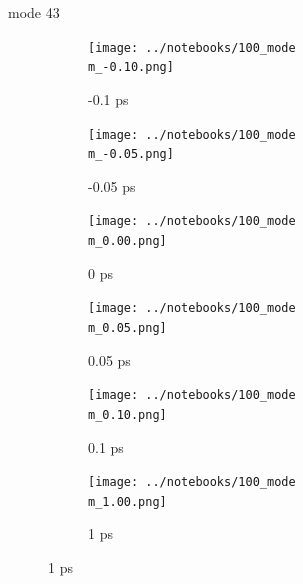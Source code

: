\documentclass{beamer}
\newcommand\w{0.32}
\begin{document}
\renewcommand\m{43}
\begin{frame}{mode \m}
	\begin{figure}
		\centering
		\begin{subfigure}[b]{\w\textwidth}
			\centering
			\texttt{[image: ../notebooks/100\_mode\\m\_-0.10.png]}
			\caption{-0.1 ps}
		\end{subfigure}
		\begin{subfigure}[b]{\w\textwidth}
			\centering
			\texttt{[image: ../notebooks/100\_mode\\m\_-0.05.png]}
			\caption{-0.05 ps}
		\end{subfigure}
		\begin{subfigure}[b]{\w\textwidth}
			\centering
			\texttt{[image: ../notebooks/100\_mode\\m\_0.00.png]}
			\caption{0 ps}
		\end{subfigure}
		\begin{subfigure}[b]{\w\textwidth}
			\centering
			\texttt{[image: ../notebooks/100\_mode\\m\_0.05.png]}
			\caption{0.05 ps}
		\end{subfigure}
		\begin{subfigure}[b]{\w\textwidth}
			\centering
			\texttt{[image: ../notebooks/100\_mode\\m\_0.10.png]}
			\caption{0.1 ps}
		\end{subfigure}
		\begin{subfigure}[b]{\w\textwidth}
			\centering
			\texttt{[image: ../notebooks/100\_mode\\m\_1.00.png]}
			\caption{1 ps}
		\end{subfigure}
	\end{figure}
\end{frame}
\end{document}
